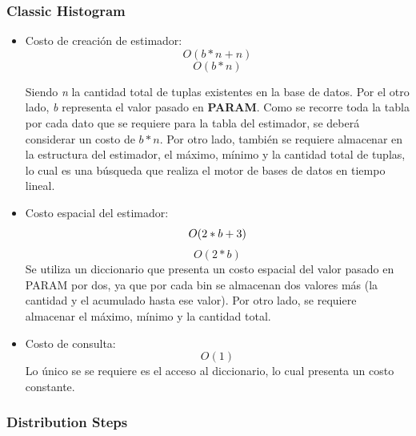\documentclass[10pt, a4paper,english,spanish,hidelinks]{article}
\begin{document}
\subsubsection{Classic Histogram}
\begin{itemize}

\item Costo de creación de estimador:
\begin{equation}
O(b * n + n )
\end{equation}
\begin{equation}
O(b * n)
\end{equation}

Siendo \textit{n} la cantidad total de tuplas existentes en la base de datos.
Por el otro lado, \textit{b} representa el valor pasado en \textbf{PARAM}.
Como se recorre toda la tabla por cada dato que se requiere para la tabla del estimador,
se deberá considerar un costo de $b * n$. Por otro lado, también se requiere almacenar en
la estructura del estimador, el máximo, mínimo y la cantidad total de tuplas, lo cual es
una búsqueda que realiza el motor de bases de datos en tiempo lineal.

\item Costo espacial del estimador:
\begin{equation}
O(2 * b + 3 ) \\
\end{equation}
\begin{equation}
O(2 * b)
\end{equation}
Se utiliza un diccionario que presenta un costo espacial del valor pasado en PARAM por dos,
ya que por cada bin se almacenan dos valores más (la cantidad y el acumulado hasta ese valor).
Por otro lado, se requiere almacenar el máximo, mínimo y la cantidad total.

\item Costo de consulta:
\begin{equation}
O(1)
\end{equation}
Lo único se se requiere es el acceso al diccionario, lo cual presenta un costo constante.

\end{itemize}
\subsubsection{Distribution Steps}
\end{document}
